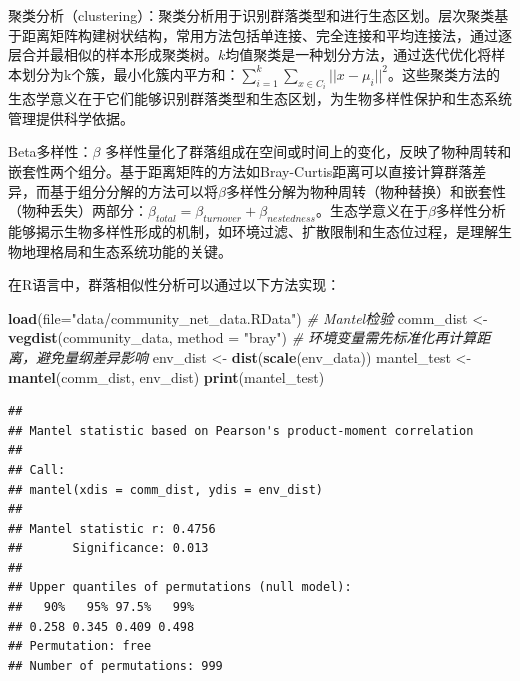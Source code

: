 \documentclass[
  twoside,12pt,fontset=none]{ctexbook}
\newenvironment{Shaded}{\begin{snugshade}}{\end{snugshade}}
\newcommand{\AttributeTok}[1]{\textcolor[rgb]{0.13,0.29,0.53}{#1}}
\newcommand{\CommentTok}[1]{\textcolor[rgb]{0.56,0.35,0.01}{\textit{#1}}}
\newcommand{\FunctionTok}[1]{\textcolor[rgb]{0.13,0.29,0.53}{\textbf{#1}}}
\newcommand{\NormalTok}[1]{#1}
\newcommand{\OtherTok}[1]{\textcolor[rgb]{0.56,0.35,0.01}{#1}}
\newcommand{\StringTok}[1]{\textcolor[rgb]{0.31,0.60,0.02}{#1}}
\begin{document}
聚类分析（clustering）：聚类分析用于识别群落类型和进行生态区划。层次聚类基于距离矩阵构建树状结构，常用方法包括单连接、完全连接和平均连接法，通过逐层合并最相似的样本形成聚类树。\(k\)均值聚类是一种划分方法，通过迭代优化将样本划分为k个簇，最小化簇内平方和：\(\sum_{i=1}^k\sum_{x\in C_i}||x-\mu_i||^2\)。这些聚类方法的生态学意义在于它们能够识别群落类型和生态区划，为生物多样性保护和生态系统管理提供科学依据。

Beta多样性：\(\beta\) 多样性量化了群落组成在空间或时间上的变化，反映了物种周转和嵌套性两个组分。基于距离矩阵的方法如Bray-Curtis距离可以直接计算群落差异，而基于组分分解的方法可以将\(\beta\)多样性分解为物种周转（物种替换）和嵌套性（物种丢失）两部分：\(\beta_{total} = \beta_{turnover} + \beta_{nestedness}\)。生态学意义在于\(\beta\)多样性分析能够揭示生物多样性形成的机制，如环境过滤、扩散限制和生态位过程，是理解生物地理格局和生态系统功能的关键。

在R语言中，群落相似性分析可以通过以下方法实现：

\begin{Shaded}
\begin{Highlighting}[]
\FunctionTok{load}\NormalTok{(}\AttributeTok{file=}\StringTok{"data/community\_net\_data.RData"}\NormalTok{)}
\CommentTok{\# Mantel检验}
\NormalTok{comm\_dist }\OtherTok{\textless{}{-}} \FunctionTok{vegdist}\NormalTok{(community\_data, }\AttributeTok{method =} \StringTok{"bray"}\NormalTok{)}
\CommentTok{\# 环境变量需先标准化再计算距离，避免量纲差异影响}
\NormalTok{env\_dist }\OtherTok{\textless{}{-}} \FunctionTok{dist}\NormalTok{(}\FunctionTok{scale}\NormalTok{(env\_data))}
\NormalTok{mantel\_test }\OtherTok{\textless{}{-}} \FunctionTok{mantel}\NormalTok{(comm\_dist, env\_dist)}
\FunctionTok{print}\NormalTok{(mantel\_test)}
\end{Highlighting}
\end{Shaded}

\begin{verbatim}
## 
## Mantel statistic based on Pearson's product-moment correlation 
## 
## Call:
## mantel(xdis = comm_dist, ydis = env_dist) 
## 
## Mantel statistic r: 0.4756 
##       Significance: 0.013 
## 
## Upper quantiles of permutations (null model):
##   90%   95% 97.5%   99% 
## 0.258 0.345 0.409 0.498 
## Permutation: free
## Number of permutations: 999
\end{verbatim}
\end{document}
